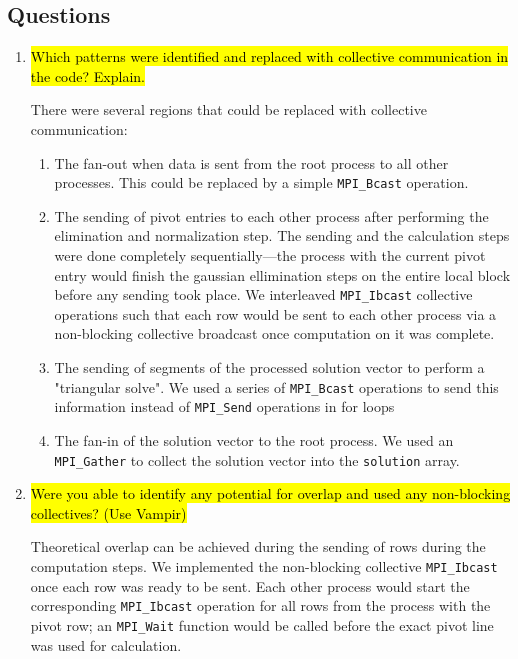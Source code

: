 \subsection{Questions}
\begin{enumerate}
	\item \hl{Which patterns were identified and replaced with collective communication in the code? Explain.}
	
	There were several regions that could be replaced with collective communication:
	\begin{enumerate}
	\item The fan-out when data is sent from the root process to all other processes. This could be replaced by a simple \verb!MPI_Bcast! operation. 
	
	\item The sending of pivot entries to each other process after performing the elimination and normalization step. The sending and the calculation steps were done completely sequentially---the process with the current pivot entry would finish the gaussian ellimination steps on the entire local block before any sending took place. We interleaved \verb!MPI_Ibcast! collective operations such that each row would be sent to each other process via a non-blocking collective broadcast once computation on it was complete.
	
	\item The sending of segments of the processed solution vector to perform a "triangular solve". We used a series of \verb!MPI_Bcast! operations to send this information instead of \verb!MPI_Send! operations in for loops
	
	\item The fan-in of the solution vector to the root process. We used an \verb!MPI_Gather! to collect the solution vector into the \verb!solution! array.
	
	\end{enumerate}
	
	\item \hl{Were you able to identify any potential for overlap and used any non-blocking collectives? (Use Vampir)}	
	
	Theoretical overlap can be achieved during the sending of rows during the computation steps. 
	We implemented the non-blocking collective \verb!MPI_Ibcast! once each row was ready to be sent. 
	Each other process would start the corresponding \verb!MPI_Ibcast! operation for 
	all rows from the process with the pivot row; an \verb!MPI_Wait! function would be 
	called before the exact pivot line was used for calculation.
	

\end{enumerate}
